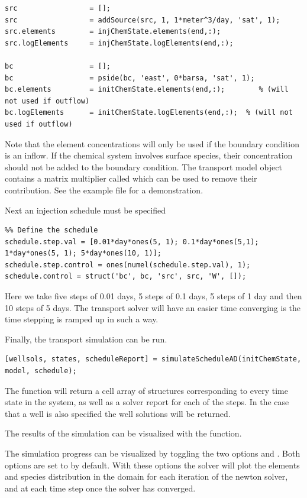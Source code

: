 \documentclass{article}
\begin{document}
\begin{lstlisting}
src                	= [];
src               	= addSource(src, 1, 1*meter^3/day, 'sat', 1);
src.elements        = injChemState.elements(end,:);
src.logElements     = injChemState.logElements(end,:);

bc                  = [];
bc                  = pside(bc, 'east', 0*barsa, 'sat', 1);
bc.elements         = initChemState.elements(end,:);        % (will not used if outflow)
bc.logElements      = initChemState.logElements(end,:);  % (will not used if outflow)
\end{lstlisting}

Note that the element concentrations will only be used if the boundary condition is an inflow. If the chemical system involves surface species, their concentration should not be added to the boundary condition. The transport model object contains a matrix multiplier called  which can be used to remove their contribution. See the example file  for a demonstration. 

Next an injection schedule must be specified

\begin{lstlisting}
%% Define the schedule
schedule.step.val = [0.01*day*ones(5, 1); 0.1*day*ones(5,1); 1*day*ones(5, 1); 5*day*ones(10, 1)];
schedule.step.control = ones(numel(schedule.step.val), 1);
schedule.control = struct('bc', bc, 'src', src, 'W', []);
\end{lstlisting}

Here we take five steps of 0.01 days, 5 steps of 0.1 days, 5 steps of 1 day and then 10 steps of 5 days. The transport solver will have an easier time converging is the time stepping is ramped up in such a way. 

Finally, the transport simulation can be run. 

\begin{lstlisting}
[wellsols, states, scheduleReport] = simulateScheduleAD(initChemState, model, schedule);
\end{lstlisting}

The function will return a cell array of  structures corresponding to every time state in the system, as well as a solver report for each of the steps. In the case that a well is also specified the well solutions will be returned.

The results of the simulation can be visualized with the  function.

The simulation progress can be visualized by toggling the two options  and . Both options are set to  by default. With these options the solver will plot the elements and species distribution in the domain for each iteration of the newton solver, and at each time step once the solver has converged. 
\end{document}
